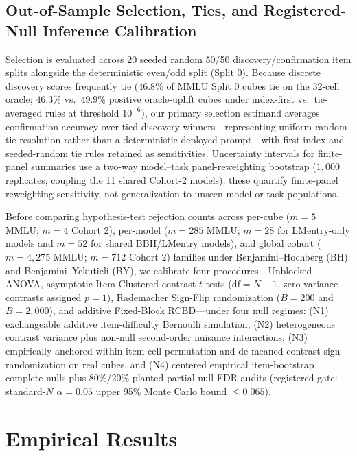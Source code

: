 \documentclass[11pt,a4paper]{article}
\begin{document}
\subsection{Out-of-Sample Selection, Ties, and Registered-Null Inference Calibration}
Selection is evaluated across 20 seeded random 50/50 discovery/confirmation item splits alongside the deterministic even/odd split (Split 0). Because discrete discovery scores frequently tie ($46.8\%$ of MMLU Split 0 cubes tie on the 32-cell oracle; $46.3\%$ vs.\ $49.9\%$ positive oracle-uplift cubes under index-first vs.\ tie-averaged rules at threshold $10^{-6}$), our primary selection estimand averages confirmation accuracy over tied discovery winners—representing uniform random tie resolution rather than a deterministic deployed prompt—with first-index and seeded-random tie rules retained as sensitivities. Uncertainty intervals for finite-panel summaries use a two-way model--task panel-reweighting bootstrap ($1{,}000$ replicates, coupling the 11 shared Cohort-2 models); these quantify finite-panel reweighting sensitivity, not generalization to unseen model or task populations.

Before comparing hypothesis-test rejection counts across per-cube ($m=5$ MMLU; $m=4$ Cohort 2), per-model ($m=285$ MMLU; $m=28$ for LMentry-only models and $m=52$ for shared BBH/LMentry models), and global cohort ($m=4{,}275$ MMLU; $m=712$ Cohort 2) families under Benjamini--Hochberg (BH) and Benjamini--Yekutieli (BY), we calibrate four procedures—Unblocked ANOVA, asymptotic Item-Clustered contrast $t$-tests ($\mathrm{df}=N-1$, zero-variance contrasts assigned $p=1$), Rademacher Sign-Flip randomization ($B=200$ and $B=2{,}000$), and additive Fixed-Block RCBD—under four null regimes: (N1) exchangeable additive item-difficulty Bernoulli simulation, (N2) heterogeneous contrast variance plus non-null second-order nuisance interactions, (N3) empirically anchored within-item cell permutation and de-meaned contrast sign randomization on real cubes, and (N4) centered empirical item-bootstrap complete nulls plus 80\%/20\% planted partial-null FDR audits (registered gate: standard-$N$ $\alpha=0.05$ upper 95\% Monte Carlo bound $\le 0.065$).



\section{Empirical Results}
\end{document}

